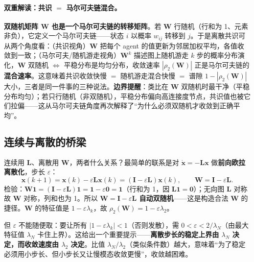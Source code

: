 \paragraph{双重解读：共识 $=$ 马尔可夫链混合。}
\textbf{双随机矩阵 $\mathbf{W}$ 也是一个马尔可夫链的转移矩阵}。若 $\mathbf{W}$ 行随机（行和为 1、元素非负），它定义一个马尔可夫链——状态 $i$ 以概率 $w_{ij}$ 转移到 $j$。于是离散共识可从两个角度看：（共识视角）$\mathbf{W}$ 把每个 agent 的值更新为邻居加权平均，各值收敛到一致；（马尔可夫/随机游走视角）$\mathbf{W}^k$ 描述图上随机游走 $k$ 步的概率分布演化，$\mathbf{W}$ 双随机 $\iff$ 平稳分布是均匀分布，收敛速率 $|\rho_2(\mathbf{W})|$ 正是马尔可夫链的\textbf{混合速率}。这意味着共识收敛快慢 $=$ 随机游走混合快慢 $=$ 谱隙 $1-|\rho_2(\mathbf{W})|$ 大小，三者是同一件事的三种说法。\textbf{边界提醒}：类比在 $\mathbf{W}$ 双随机时最干净（平稳分布均匀）；若只行随机（非双随机），平稳分布偏向高连接度节点，共识值也被它们拉偏——这从马尔可夫链角度再次解释了“为什么必须双随机才收敛到正确平均”。

\subsection{连续与离散的桥梁}
\label{sec:cs-bridge}

连续用 $\mathbf{L}$、离散用 $\mathbf{W}$，两者什么关系？最简单的联系是对 $\dot{\mathbf{x}}=-\mathbf{L}\mathbf{x}$ 做\textbf{前向欧拉离散化}，步长 $\varepsilon$：
\begin{equation}
  \mathbf{x}(k{+}1)=\mathbf{x}(k)-\varepsilon\mathbf{L}\mathbf{x}(k)=(\mathbf{I}-\varepsilon\mathbf{L})\mathbf{x}(k),\qquad \mathbf{W}=\mathbf{I}-\varepsilon\mathbf{L}.
  \label{eq:cs-euler}
\end{equation}
检验：$\mathbf{W}\mathbf{1}=(\mathbf{I}-\varepsilon\mathbf{L})\mathbf{1}=\mathbf{1}-\varepsilon\mathbf{0}=\mathbf{1}$（行和为 1，因 $\mathbf{L}\mathbf{1}=\mathbf{0}$）；无向图 $\mathbf{L}$ 对称故 $\mathbf{W}$ 对称，列和也为 1。所以 \textbf{$\mathbf{W}=\mathbf{I}-\varepsilon\mathbf{L}$ 自动双随机}——这是构造合法 $\mathbf{W}$ 的捷径。$\mathbf{W}$ 的特征值是 $1-\varepsilon\lambda_k$，故 $\rho_2(\mathbf{W})=1-\varepsilon\lambda_2$。

但 $\varepsilon$ 不能随便取：要让所有 $|1-\varepsilon\lambda_k|<1$（否则发散），需 $0<\varepsilon<2/\lambda_N$（由最大特征值 $\lambda_N$ 卡住上界）。这给出一个重要提示——\textbf{离散步长的稳定上界由 $\lambda_N$ 决定，而收敛速度由 $\lambda_2$ 决定}。比值 $\lambda_N/\lambda_2$（类似条件数）越大，意味着“为了稳定必须用小步长、但小步长又让慢模态收敛更慢”，收敛越困难。

